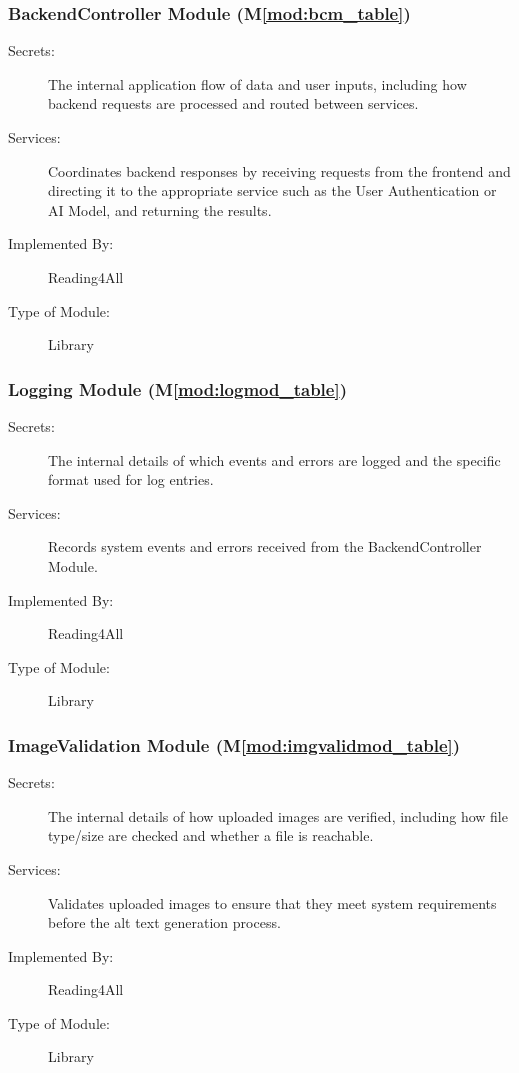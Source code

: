 \documentclass[12pt, titlepage]{article}
\newcommand{\mref}[1]{M\ref{#1}}
\begin{document}
\subsubsection{BackendController Module (\mref{mod:bcm_table})}
\label{mod:bcm}
\begin{description}
  \item[Secrets:] The internal application flow of data and user
    inputs, including how backend requests are processed and routed
    between services.
  \item[Services:]Coordinates backend responses by receiving requests
    from the frontend and directing it to the appropriate service
    such as the User Authentication or  AI Model, and returning the results.
  \item[Implemented By:] Reading4All
  \item[Type of Module:] Library
\end{description}

\subsubsection{Logging Module (\mref{mod:logmod_table})}
\label{mod:logmod}
\begin{description}
  \item[Secrets:] The internal details of which events and errors are
    logged and the specific format used for log entries.
  \item[Services:] Records system events and errors received from the
    BackendController Module.
  \item[Implemented By:] Reading4All
  \item[Type of Module:] Library
\end{description}

\subsubsection{ImageValidation Module (\mref{mod:imgvalidmod_table})}
\label{mod:imgvalidmod}
\begin{description}
  \item[Secrets:] The internal details of how uploaded images are
    verified, including how file type/size are checked and whether a
    file is reachable.
  \item[Services:] Validates uploaded images to ensure that they meet
    system requirements before the alt text generation process.
  \item[Implemented By:] Reading4All
  \item[Type of Module:] Library
\end{description}
\end{document}
